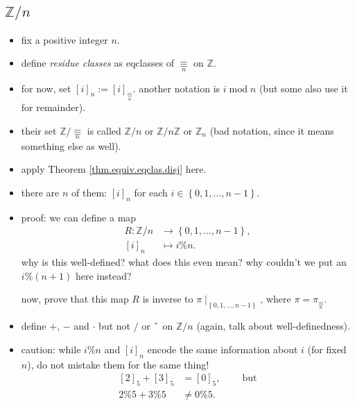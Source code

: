 \documentclass[numbers=enddot,12pt,final,onecolumn,notitlepage]{scrartcl}%
\numberwithin{exer}{subsection}
\theoremstyle{definition}
\begin{document}
\subsection{$\mathbb{Z}/n$}

\begin{itemize}
\item fix a positive integer $n$.

\item define \textit{residue classes} as eqclasses of $\underset{n}{\equiv}$
on $\mathbb{Z}$.

\item for now, set $\left[  i\right]  _{n}:=\left[  i\right]
_{\underset{n}{\equiv}}$. another notation is $i\operatorname{mod}n$ (but some
also use it for remainder).

\item their set $\mathbb{Z}/\underset{n}{\equiv}$ is called $\mathbb{Z}/n$ or
$\mathbb{Z}/n\mathbb{Z}$ or $\mathbb{Z}_{n}$ (bad notation, since it means
something else as well).

\item apply Theorem \ref{thm.equiv.eqclas.disj} here.

\item there are $n$ of them: $\left[  i\right]  _{n}$ for each $i\in\left\{
0,1,\ldots,n-1\right\}  $.

\item proof: we can define a map
\begin{align*}
R:\mathbb{Z}/n  &  \rightarrow\left\{  0,1,\ldots,n-1\right\}  ,\\
\left[  i\right]  _{n}  &  \mapsto i\%n.
\end{align*}
why is this well-defined? what does this even mean? why couldn't we put an
$i\%\left(  n+1\right)  $ here instead?

now, prove that this map $R$ is inverse to $\pi\mid_{\left\{  0,1,\ldots
,n-1\right\}  }$, where $\pi=\pi_{\underset{n}{\equiv}}$.

\item define $+$, $-$ and $\cdot$ but not $/$ or $\symbol{94}$ on
$\mathbb{Z}/n$ (again, talk about well-definedness).

\item caution: while $i\%n$ and $\left[  i\right]  _{n}$ encode the same
information about $i$ (for fixed $n$), do not mistake them for the same
thing!
\begin{align*}
\left[  2\right]  _{5}+\left[  3\right]  _{5}  &  =\left[  0\right]
_{5},\ \ \ \ \ \ \ \ \ \ \text{but}\\
2\%5+3\%5  &  \neq0\%5.
\end{align*}



\end{itemize}
\end{document}

